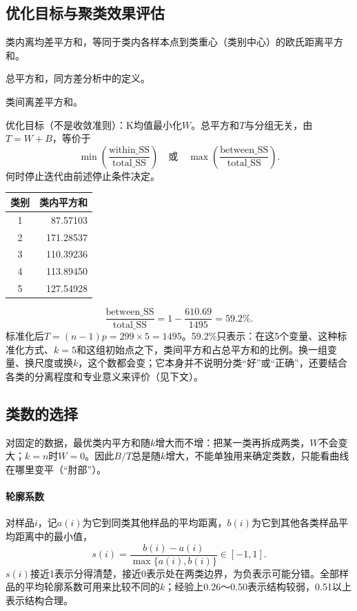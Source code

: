 \subsection{优化目标与聚类效果评估}
\begin{description}[style=nextline,leftmargin=0pt,labelwidth=0pt,labelsep=0pt]
\item[Within cluster sum of squares]类内离均差平方和，等同于类内各样本点到类重心（类别中心）的欧氏距离平方和。
\item[Total SS]总平方和，同方差分析中的定义。
\item[Between SS]类间离差平方和。
\end{description}
优化目标（不是收敛准则）：K均值最小化$W$。总平方和$T$与分组无关，由$T=W+B$，等价于
\[
\min\left(\frac{\text{within\_SS}}{\text{total\_SS}}\right)
\quad\text{或}\quad
\max\left(\frac{\text{between\_SS}}{\text{total\_SS}}\right).
\]
何时停止迭代由前述停止条件决定。
\begin{center}\begin{tabular}{cr}\toprule
{\bfseries 类别}&{\bfseries 类内平方和}\\\midrule
1&87.57103\\2&171.28537\\3&110.39236\\4&113.89450\\5&127.54928\\\bottomrule
\end{tabular}\end{center}
\[
\frac{\text{between\_SS}}{\text{total\_SS}}=1-\frac{610.69}{1495}=59.2\%.
\]
标准化后$T=(n-1)p=299\times5=1495$。59.2\%只表示：在这5个变量、这种标准化方式、$k=5$和这组初始点之下，类间平方和占总平方和的比例。换一组变量、换尺度或换$k$，这个数都会变；它本身并不说明分类“好”或“正确”，还要结合各类的分离程度和专业意义来评价（见下文）。
\subsection{类数的选择}\label{sec:k-number}
对固定的数据，最优类内平方和随$k$增大而不增：把某一类再拆成两类，$W$不会变大；$k=n$时$W=0$。因此$B/T$总是随$k$增大，不能单独用来确定类数，只能看曲线在哪里变平（“肘部”）。
\paragraph{轮廓系数} 对样品$i$，记$a(i)$为它到同类其他样品的平均距离，$b(i)$为它到其他各类样品平均距离中的最小值，
\[
s(i)=\frac{b(i)-a(i)}{\max\{a(i),b(i)\}}\in[-1,1].
\]
$s(i)$接近1表示分得清楚，接近0表示处在两类边界，为负表示可能分错。全部样品的平均轮廓系数可用来比较不同的$k$；经验上0.26～0.50表示结构较弱，0.51以上表示结构合理。
